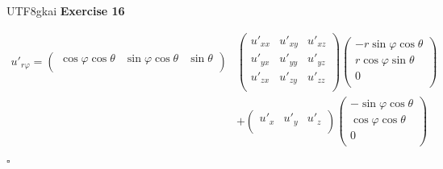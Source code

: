 \documentclass{article}
\newenvironment{exercise}[1]{%
{\textbf{Exercise #1} \\ 
    }
}{
  \hfill $\square$ 
  \par\bigskip 
}
\begin{document}
\begin{CJK}{UTF8}{gkai}
\begin{exercise}{16}
    \[
    \begin{aligned}  
    u'_{r\varphi} = \begin{pmatrix}
        \cos \varphi \cos \theta&\sin \varphi \cos \theta&\sin \theta\\ 
    \end{pmatrix}&
    \begin{pmatrix}
        u'_{xx}&u'_{xy}&u'_{xz}\\
        u'_{yx}&u'_{yy}&u'_{yz}\\
        u'_{zx}&u'_{zy}&u'_{zz}\\
    \end{pmatrix}
    \begin{pmatrix}
        -r \sin \varphi \cos \theta \\r \cos \varphi \sin \theta \\0\\ 
    \end{pmatrix}\\
    &+
    \begin{pmatrix}
        u'_x&u'_y&u'_z\\
    \end{pmatrix}
    \begin{pmatrix}
        -\sin \varphi \cos \theta\\\cos \varphi \cos \theta\\0\\      
    \end{pmatrix}
    \end{aligned}  
    \]
    

\end{exercise}
\end{CJK}
\end{document}

